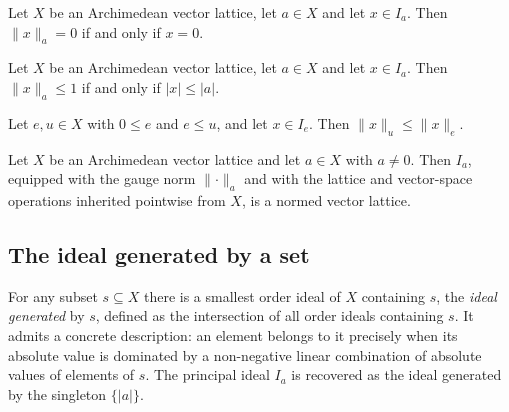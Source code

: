 \begin{lemma}
\label{lem:orderIdeal-gaugeNorm-eq-zero-iff}
\leanok
{}
Let $X$ be an Archimedean vector lattice, let $a \in X$ and let
$x \in I_a$. Then $\lVert x \rVert_a = 0$ if and only if $x = 0$.
\end{lemma}

\begin{lemma}
\label{lem:orderIdeal-gaugeNorm-le-one-iff}
\leanok
{}
Let $X$ be an Archimedean vector lattice, let $a \in X$ and let
$x \in I_a$. Then $\lVert x \rVert_a \le 1$ if and only if
$\lvert x \rvert \le \lvert a \rvert$.
\end{lemma}

\begin{lemma}
\label{lem:orderIdeal-gaugeNorm-anti}
\leanok
{}
Let $e, u \in X$ with $0 \le e$ and $e \le u$, and let $x \in I_e$.
Then $\lVert x \rVert_u \le \lVert x \rVert_e$.
\end{lemma}

\begin{theorem}
\label{thm:orderIdeal-principalNormedVectorLattice}
\leanok
{}
Let $X$ be an Archimedean vector lattice and let $a \in X$ with
$a \ne 0$. Then $I_a$, equipped with the gauge norm
$\lVert \cdot \rVert_a$ and with the lattice and vector-space
operations inherited pointwise from $X$, is a normed vector lattice.
\end{theorem}

\subsection{The ideal generated by a set}

For any subset $s \subseteq X$ there is a smallest order ideal of
$X$ containing $s$, the \emph{ideal generated} by $s$, defined as
the intersection of all order ideals containing $s$. It admits a
concrete description: an element belongs to it precisely when its
absolute value is dominated by a non-negative linear combination of
absolute values of elements of $s$. The principal ideal $I_a$ is
recovered as the ideal generated by the singleton $\{\lvert a
\rvert\}$.

